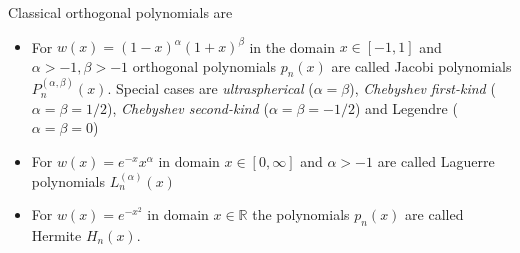 \documentclass{article}
\begin{document}
\begin{definition}[label=18x0c7vo, name=Orthogonal Polynomials]
	\begin{example}[label=m8pnoa7d, name=Classical Polynomials]
		Classical orthogonal polynomials are

		\begin{itemize}
			\item For \( w(x) = (1-x)^\alpha(1+x)^\beta \) in the domain \( x\in[-1,1] \)
				and \( \alpha > -1, \beta > -1 \) orthogonal
				polynomials \( p_n(x) \) are called Jacobi
				polynomials \( P_n^{(\alpha,\beta)}(x) \).
				Special cases are \emph{ultraspherical}
				(\(\alpha=\beta\)), \emph{Chebyshev first-kind}
				(\(\alpha=\beta=1/2\)), \emph{Chebyshev
				second-kind} (\( \alpha=\beta=-1/2 \)) and
				Legendre (\(\alpha=\beta=0\))
			\item For \( w(x) = e^{-x}x^\alpha \) in domain
				\(x\in[0,\infty]\) and \( \alpha > -1 \) are
				called Laguerre polynomials \( L_n^{(\alpha)}(x) \)
			\item For \(w(x) = e^{-x^2}\) in domain \(
				x\in\mathbb{R}\) the polynomials \(p_n(x)\) are
				called Hermite \(H_n(x)\).
		\end{itemize}
	\end{example}
\end{definition}
\end{document}

